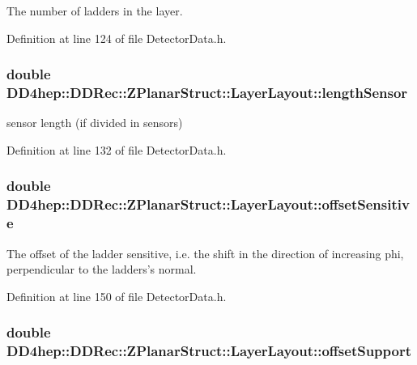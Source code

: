 The number of ladders in the layer. 

Definition at line 124 of file DetectorData.h.\hypertarget{struct_d_d4hep_1_1_d_d_rec_1_1_z_planar_struct_1_1_layer_layout_a9ad59213381cec4c5f5bfb7c8a5e8763}{
\subsubsection[{lengthSensor}]{\setlength{\rightskip}{0pt plus 5cm}double {\bf DD4hep::DDRec::ZPlanarStruct::LayerLayout::lengthSensor}}}
\label{struct_d_d4hep_1_1_d_d_rec_1_1_z_planar_struct_1_1_layer_layout_a9ad59213381cec4c5f5bfb7c8a5e8763}


sensor length (if divided in sensors) 

Definition at line 132 of file DetectorData.h.\hypertarget{struct_d_d4hep_1_1_d_d_rec_1_1_z_planar_struct_1_1_layer_layout_a80e60caf98db3f296a3d995e77c3f8c6}{
\subsubsection[{offsetSensitive}]{\setlength{\rightskip}{0pt plus 5cm}double {\bf DD4hep::DDRec::ZPlanarStruct::LayerLayout::offsetSensitive}}}
\label{struct_d_d4hep_1_1_d_d_rec_1_1_z_planar_struct_1_1_layer_layout_a80e60caf98db3f296a3d995e77c3f8c6}


The offset of the ladder sensitive, i.e. the shift in the direction of increasing phi, perpendicular to the ladders's normal. 

Definition at line 150 of file DetectorData.h.\hypertarget{struct_d_d4hep_1_1_d_d_rec_1_1_z_planar_struct_1_1_layer_layout_ae19dff80b6c19640638709b1030f966e}{
\subsubsection[{offsetSupport}]{\setlength{\rightskip}{0pt plus 5cm}double {\bf DD4hep::DDRec::ZPlanarStruct::LayerLayout::offsetSupport}}}
\label{struct_d_d4hep_1_1_d_d_rec_1_1_z_planar_struct_1_1_layer_layout_ae19dff80b6c19640638709b1030f966e}


